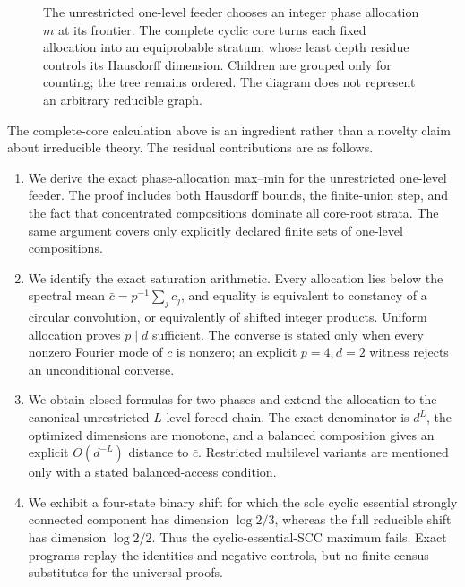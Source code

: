 \begin{figure}[t]
  \centering
  
  \caption{The unrestricted one-level feeder chooses an integer phase
  allocation $m$ at its frontier.  The complete cyclic core turns each fixed
  allocation into an equiprobable stratum, whose least depth residue controls
  its Hausdorff dimension.  Children are grouped only for counting; the tree
  remains ordered.  The diagram does not represent an arbitrary reducible
  graph.}
  \label{fig:mechanism}
\end{figure}

The complete-core calculation above is an ingredient rather than a novelty
claim about irreducible theory.  The residual contributions are as follows.

\begin{enumerate}[label=(\roman*)]
  \item We derive the exact phase-allocation max--min for the unrestricted
  one-level feeder.  The proof includes both Hausdorff bounds, the finite-union
  step, and the fact that concentrated compositions dominate all core-root
  strata.  The same argument covers only explicitly declared finite sets of
  one-level compositions.

  \item We identify the exact saturation arithmetic.  Every allocation lies
  below the spectral mean $\bar c=p^{-1}\sum_jc_j$, and equality is equivalent
  to constancy of a circular convolution, or equivalently of shifted integer
  products.  Uniform allocation proves $p\mid d$ sufficient.  The converse is
  stated only when every nonzero Fourier mode of $c$ is nonzero; an explicit
  $p=4,d=2$ witness rejects an unconditional converse.

  \item We obtain closed formulas for two phases and extend the allocation to
  the canonical unrestricted $L$-level forced chain.  The exact denominator is
  $d^L$, the optimized dimensions are monotone, and a balanced composition
  gives an explicit $O(d^{-L})$ distance to $\bar c$.  Restricted multilevel
  variants are mentioned only with a stated balanced-access condition.

  \item We exhibit a four-state binary shift for which the sole cyclic
  essential strongly connected component has dimension $\log 2/3$, whereas
  the full reducible shift has dimension $\log 2/2$.  Thus the cyclic-essential-SCC
  maximum fails.  Exact programs replay
  the identities and negative controls, but no finite census substitutes for
  the universal proofs.
\end{enumerate}

